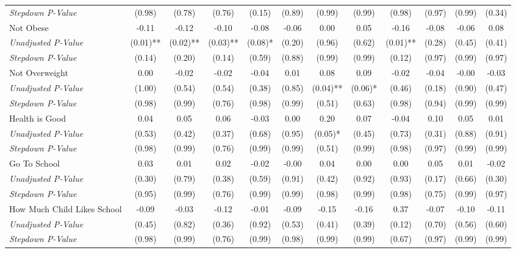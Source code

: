\begin{tabular}{l c c c c c c c c c c c}
\quad \textit{Stepdown P-Value} & (0.98) & (0.78) & (0.76) & (0.15) & (0.89) & (0.99) & (0.99) & (0.98) & (0.97) & (0.99) & (0.34) \\
Not Obese & -0.11 & -0.12 & -0.10 & -0.08 & -0.06 & 0.00 & 0.05 & -0.16 & -0.08 & -0.06 & 0.08 \\
\quad \textit{Unadjusted P-Value} & (0.01)** & (0.02)** & (0.03)** & (0.08)* & (0.20) & (0.96) & (0.62) & (0.01)** & (0.28) & (0.45) & (0.41) \\
\quad \textit{Stepdown P-Value} & (0.14) & (0.20) & (0.14) & (0.59) & (0.88) & (0.99) & (0.99) & (0.12) & (0.97) & (0.99) & (0.97) \\
Not Overweight & 0.00 & -0.02 & -0.02 & -0.04 & 0.01 & 0.08 & 0.09 & -0.02 & -0.04 & -0.00 & -0.03 \\
\quad \textit{Unadjusted P-Value} & (1.00) & (0.54) & (0.54) & (0.38) & (0.85) & (0.04)** & (0.06)* & (0.46) & (0.18) & (0.90) & (0.47) \\
\quad \textit{Stepdown P-Value} & (0.98) & (0.99) & (0.76) & (0.98) & (0.99) & (0.51) & (0.63) & (0.98) & (0.94) & (0.99) & (0.99) \\
Health is Good & 0.04 & 0.05 & 0.06 & -0.03 & 0.00 & 0.20 & 0.07 & -0.04 & 0.10 & 0.05 & 0.01 \\
\quad \textit{Unadjusted P-Value} & (0.53) & (0.42) & (0.37) & (0.68) & (0.95) & (0.05)* & (0.45) & (0.73) & (0.31) & (0.88) & (0.91) \\
\quad \textit{Stepdown P-Value} & (0.98) & (0.99) & (0.76) & (0.99) & (0.99) & (0.51) & (0.99) & (0.98) & (0.97) & (0.99) & (0.99) \\
Go To School & 0.03 & 0.01 & 0.02 & -0.02 & -0.00 & 0.04 & 0.00 & 0.00 & 0.05 & 0.01 & -0.02 \\
\quad \textit{Unadjusted P-Value} & (0.30) & (0.79) & (0.38) & (0.59) & (0.91) & (0.42) & (0.92) & (0.93) & (0.17) & (0.66) & (0.30) \\
\quad \textit{Stepdown P-Value} & (0.95) & (0.99) & (0.76) & (0.99) & (0.99) & (0.98) & (0.99) & (0.98) & (0.75) & (0.99) & (0.97) \\
How Much Child Likes School & -0.09 & -0.03 & -0.12 & -0.01 & -0.09 & -0.15 & -0.16 & 0.37 & -0.07 & -0.10 & -0.11 \\
\quad \textit{Unadjusted P-Value} & (0.45) & (0.82) & (0.36) & (0.92) & (0.53) & (0.41) & (0.39) & (0.12) & (0.70) & (0.56) & (0.60) \\
\quad \textit{Stepdown P-Value} & (0.98) & (0.99) & (0.76) & (0.99) & (0.98) & (0.99) & (0.99) & (0.67) & (0.97) & (0.99) & (0.99) \\

\end{tabular}
